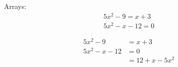 \documentclass[11pt]{article}
\begin{document}

Arrays:
\begin{align} %
    5x^2-9=x+3\\
    5x^2-x-12=0
\end{align}

\begin{align*} %
    5x^2-9&=x+3\\
    5x^2-x-12&=0\\
    &=12+x-5x^2
\end{align*}
\end{document}
